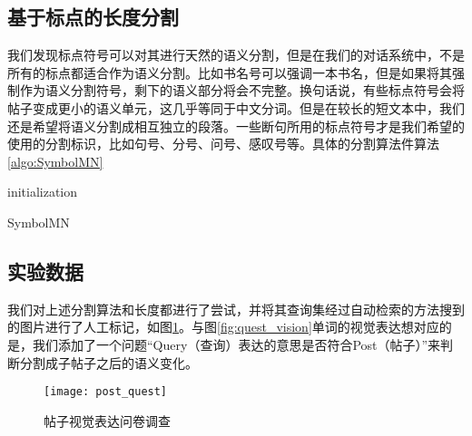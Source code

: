 \subsection{基于标点的长度分割}
我们发现标点符号可以对其进行天然的语义分割，但是在我们的对话系统中，不是所有的标点都适合作为语义分割。比如书名号可以强调一本书名，但是如果将其强制作为语义分割符号，剩下的语义部分将会不完整。换句话说，有些标点符号会将帖子变成更小的语义单元，这几乎等同于中文分词。但是在较长的短文本中，我们还是希望将语义分割成相互独立的段落。一些断句所用的标点符号才是我们希望的使用的分割标识，比如句号、分号、问号、感叹号等。具体的分割算法件算法\ref{algo:SymbolMN}
\begin{algorithm}[htbp]
\SetAlgoLined
{}

initialization\;
\caption{SymbolMN}
\label{algo:SymbolMN}
\end{algorithm}

\subsection{实验数据}

我们对上述分割算法和长度都进行了尝试，并将其查询集经过自动检索的方法搜到的图片进行了人工标记，如图\ref{fig:post_quest}。与图\ref{fig:quest_vision}单词的视觉表达想对应的是，我们添加了一个问题“Query（查询）表达的意思是否符合Post（帖子）”来判断分割成子帖子之后的语义变化。

\begin{figure}[ht]
\centering
\texttt{[image: post\_quest]}
\caption{帖子视觉表达问卷调查} \label{fig:post_quest}
\end{figure}

